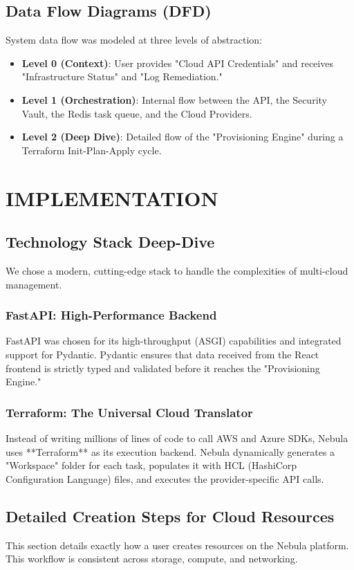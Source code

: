\section{Data Flow Diagrams (DFD)}
System data flow was modeled at three levels of abstraction:
\begin{itemize}
    \item \textbf{Level 0 (Context)}: User provides "Cloud API Credentials" and receives "Infrastructure Status" and "Log Remediation."
    \item \textbf{Level 1 (Orchestration)}: Internal flow between the API, the Security Vault, the Redis task queue, and the Cloud Providers.
    \item \textbf{Level 2 (Deep Dive)}: Detailed flow of the "Provisioning Engine" during a Terraform Init-Plan-Apply cycle.
\end{itemize}

\newpage
\chapter{IMPLEMENTATION}

\section{Technology Stack Deep-Dive}
We chose a modern, cutting-edge stack to handle the complexities of multi-cloud management.

\subsection{FastAPI: High-Performance Backend}
FastAPI was chosen for its high-throughput (ASGI) capabilities and integrated support for Pydantic. Pydantic ensures that data received from the React frontend is strictly typed and validated before it reaches the "Provisioning Engine."

\subsection{Terraform: The Universal Cloud Translator}
Instead of writing millions of lines of code to call AWS and Azure SDKs, Nebula uses **Terraform** as its execution backend. Nebula dynamically generates a "Workspace" folder for each task, populates it with HCL (HashiCorp Configuration Language) files, and executes the provider-specific API calls.

\section{Detailed Creation Steps for Cloud Resources}
This section details exactly how a user creates resources on the Nebula platform. This workflow is consistent across storage, compute, and networking.

